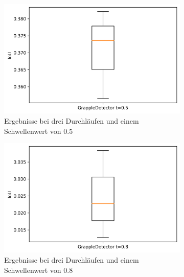     \begin{figure}[h]
    	\centering
    	\begin{subfigure}[c]{0.29\textwidth}			
    		\includegraphics[width=1\textwidth,center]{bilder/Hauptteil/Autoencoder_Grappel_Detection/IoU_05_AE_Grapple.png}
    		\caption{Ergebnisse bei drei Durchläufen und einem Schwellenwert von 0.5}
    		\label{img:BoxPlot_RegressionAufAutoencoder05}	
    	\end{subfigure}
    	\centering
    \begin{subfigure}[c]{0.29\textwidth}			
    	\includegraphics[width=1\textwidth,center]{bilder/Hauptteil/Autoencoder_Grappel_Detection/IoU_08_AE_Grapple.png}
    	\caption{Ergebnisse bei drei Durchläufen und einem Schwellenwert von 0.8}
    	\label{img:BoxPlot_RegressionAufAutoencoder08}	
    \end{subfigure}
    	\begin{subfigure}[c]{0.29\textwidth}			

\end{subfigure}
\end{figure}
